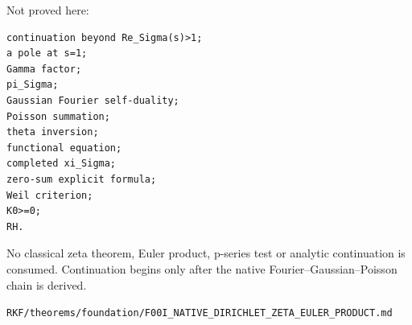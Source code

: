 Not proved here:

\begin{verbatim}
continuation beyond Re_Sigma(s)>1;
a pole at s=1;
Gamma factor;
pi_Sigma;
Gaussian Fourier self-duality;
Poisson summation;
theta inversion;
functional equation;
completed xi_Sigma;
zero-sum explicit formula;
Weil criterion;
K0>=0;
RH.
\end{verbatim}

No classical zeta theorem, Euler product, p-series test or analytic continuation
is consumed. Continuation begins only after the native Fourier--Gaussian--Poisson
chain is derived.

\begin{flushright}\small\texttt{RKF/theorems/foundation/F00I\_NATIVE\_DIRICHLET\_ZETA\_EULER\_PRODUCT.md}\end{flushright}
